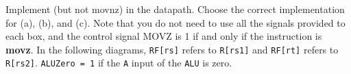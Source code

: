 \begin{blocksection}

\question
Implement  (but not movnz) in the datapath. Choose the correct implementation for (a), (b), and (c). Note that you do not need to use all the signals provided to each box, and the control signal MOVZ is 1 if and only if the instruction is \textbf{movz}. In the following diagrams, \texttt{RF[rs]} refers to \texttt{R[rs1]} and \texttt{RF[rt]} refers to \texttt{R[rs2]}. \texttt{ALUZero = 1} if the \texttt{A} input of the \texttt{ALU} is zero.


\end{blocksection}